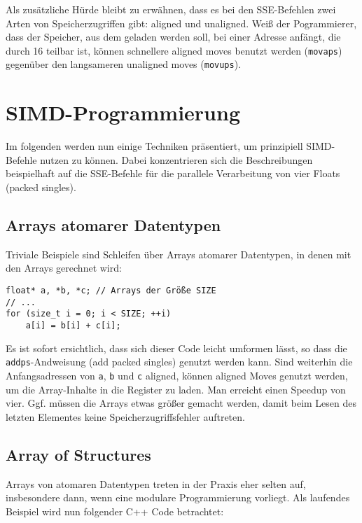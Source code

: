 \documentclass[a4paper,10pt]{article}
\begin{document}
Als zusätzliche Hürde bleibt zu erwähnen, dass es bei den SSE-Befehlen zwei Arten von
Speicherzugriffen gibt: aligned und unaligned. Weiß der Pogrammierer, dass der Speicher, aus dem
geladen werden soll, bei einer Adresse anfängt, die durch 16 teilbar ist, können schnellere aligned
moves benutzt werden (\texttt{movaps}) gegenüber den langsameren unaligned moves (\texttt{movups}).

\newpage
\section{SIMD-Programmierung}

Im folgenden werden nun einige Techniken präsentiert, um prinzipiell SIMD-Befehle nutzen zu können.
Dabei konzentrieren sich die Beschreibungen beispielhaft auf die SSE-Befehle für die parallele
Verarbeitung von vier Floats (packed singles). 

\subsection{Arrays atomarer Datentypen}

Triviale Beispiele sind Schleifen über Arrays atomarer Datentypen, in denen mit den Arrays
gerechnet wird:

\begin{verbatim}
float* a, *b, *c; // Arrays der Größe SIZE
// ...
for (size_t i = 0; i < SIZE; ++i)
    a[i] = b[i] + c[i];
\end{verbatim}

Es ist sofort ersichtlich, dass sich dieser Code leicht umformen lässt, so dass die
\texttt{addps}-Andweisung (add packed singles) genutzt werden kann. Sind weiterhin die
Anfangsadressen von \texttt{a}, \texttt{b} und \texttt{c} aligned, können aligned Moves genutzt
werden, um die Array-Inhalte in die Register zu laden. Man erreicht einen Speedup von vier. Ggf.
müssen die Arrays etwas größer gemacht werden, damit beim Lesen des letzten Elementes keine
Speicherzugriffsfehler auftreten.

\subsection{Array of Structures}

Arrays von atomaren Datentypen treten in der Praxis eher selten auf, insbesondere dann, wenn eine
modulare Programmierung vorliegt. Als laufendes Beispiel wird nun folgender C++ Code betrachtet:
\end{document}
